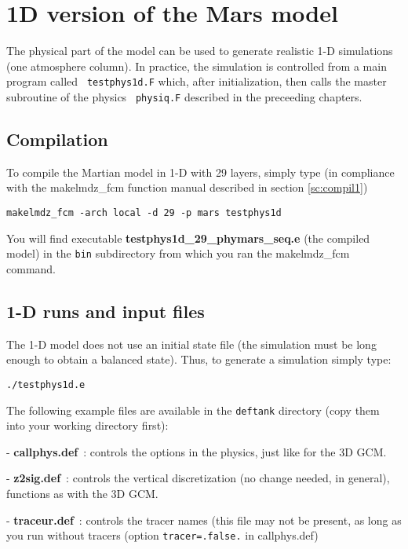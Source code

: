 \chapter{1D version of the Mars model}

\label{sc:testphys1d}

The physical part of the model can be used to generate realistic 
1-D simulations (one atmosphere column). 
In practice, the simulation is controlled from a main program called
\verb+ testphys1d.F+ which, after initialization, then calls the master
subroutine of the physics \verb+ physiq.F+ described in the preceeding
chapters.

\section{Compilation} 
To compile the Martian model in 1-D with
29 layers, simply type
(in compliance with the makelmdz\_fcm function manual described in section
\ref{sc:compil1})

\begin{verbatim}
makelmdz_fcm -arch local -d 29 -p mars testphys1d
\end{verbatim}

You will find executable {\bf testphys1d\_29\_phymars\_seq.e}
(the compiled model)
in the {\tt bin} subdirectory from which you ran the makelmdz\_fcm command.

\section{1-D runs and input files}

The 1-D model does not use an initial state file (the simulation must be long
enough to obtain a balanced state). Thus, to generate a simulation simply
type:

\begin{verbatim}
./testphys1d.e
\end{verbatim}

The following example files are available in the {\tt deftank} directory
(copy them into your working directory first):

- {\bf callphys.def}~: controls the options in the physics,
  just like for the 3D GCM.

- {\bf z2sig.def}~:
 controls the vertical discretization
 (no change needed, in general), functions as with the 3D GCM. 

- {\bf traceur.def}~:
 controls the tracer names (this file may not be present, as long
 as you run without tracers (option {\tt tracer=.false.} in
 callphys.def)

